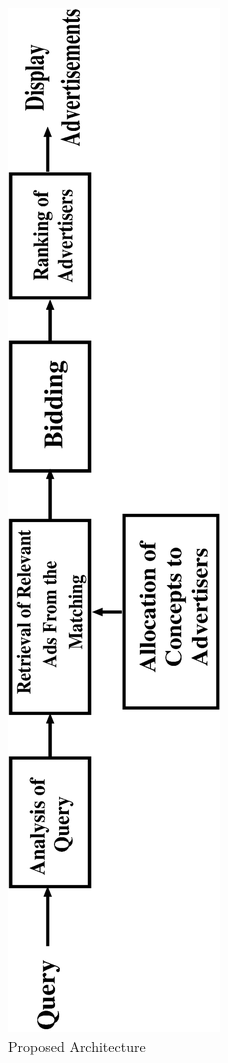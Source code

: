 \begin{enumerate}[label=(\roman*).]
\begin{figure}
	\centering
\includegraphics[scale=0.37,angle = 270]{visuals/ProposedArchitectureJournal.eps}
	\caption{Proposed Architecture}
	\label{fig:proposedArchitectureJournal}
\end{figure}

\end{enumerate}

